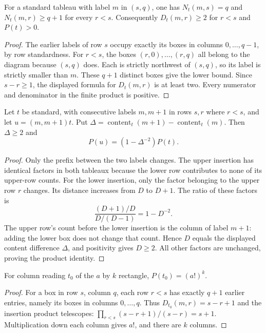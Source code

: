 \begin{lemma}
\label{lem:prefix-norm-positive}
\leanok
For a standard tableau with label $m$ in $(s,q)$, one has
$N_t(m,s)=q$ and $N_t(m,r)\geq q+1$ for every $r<s$.
Consequently $D_t(m,r)\geq2$ for $r<s$ and $P(t)>0$.
\end{lemma}
\begin{proof}
The earlier labels of row $s$ occupy exactly its boxes in columns
$0,\ldots,q-1$, by row standardness. For $r<s$, the boxes
$(r,0),\ldots,(r,q)$ all belong to the diagram because $(s,q)$ does.
Each is strictly northwest of $(s,q)$, so its label is strictly
smaller than $m$. These $q+1$ distinct boxes give the lower bound.
Since $s-r\geq1$, the displayed formula for $D_t(m,r)$ is at least
two. Every numerator and denominator in the finite product is positive.
\end{proof}

\begin{lemma}
\label{lem:prefix-norm-swap}
\leanok
Let $t$ be standard, with consecutive labels $m,m+1$ in rows $s,r$
where $r<s$, and let $u=(m,m+1)t$. Put
$\Delta=\operatorname{content}_t(m+1)-\operatorname{content}_t(m)$.
Then $\Delta\geq2$ and
\[
 P(u)=(1-\Delta^{-2})P(t).
\]
\end{lemma}
\begin{proof}
Only the prefix between the two labels changes. The upper insertion
has identical factors in both tableaux because the lower row contributes
to none of its upper-row counts. For the lower insertion, only the factor
belonging to the upper row $r$ changes. Its distance increases from
$D$ to $D+1$. The ratio of these factors is
\[
 \frac{(D+1)/D}{D/(D-1)}=1-D^{-2}.
\]
The upper row's count before the lower insertion is the column of label
$m+1$: adding the lower box does not change that count. Hence $D$ equals
the displayed content difference $\Delta$, and positivity gives $D\geq2$.
All other factors are unchanged, proving the product identity.
\end{proof}

\begin{lemma}
\label{lem:prefix-norm-initial}
\leanok
For column reading $t_0$ of the $a$ by $k$ rectangle,
$P(t_0)=(a!)^k$.
\end{lemma}
\begin{proof}
For a box in row $s$, column $q$, each row $r<s$ has exactly $q+1$
earlier entries, namely its boxes in columns $0,\ldots,q$.
Thus $D_{t_0}(m,r)=s-r+1$ and the insertion product telescopes:
$\prod_{r<s}(s-r+1)/(s-r)=s+1$.
Multiplication down each column gives $a!$, and there are $k$ columns.
\end{proof}

